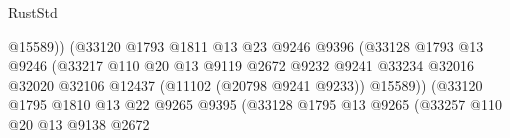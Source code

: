 \begin{lexlean}{RustStd}
\begin{coremodule}
                                                    @15589))
                                                (@33120
                                                  @1793
                                                  @1811
                                                  @13
                                                  @23
                                                  @9246
                                                  @9396
                                                  (@33128
                                                    @1793
                                                    @13
                                                    @9246
                                                    (@33217
                                                      @110
                                                      @20
                                                      @13
                                                      @9119
                                                      @2672
                                                      @9232
                                                      @9241
                                                      @33234
                                                      @32016
                                                      @32020
                                                      @32106
                                                      @12437
                                                      (@11102 (@20798 @9241 @9233))
                                                      @15589))
                                                  (@33120
                                                    @1795
                                                    @1810
                                                    @13
                                                    @22
                                                    @9265
                                                    @9395
                                                    (@33128
                                                      @1795
                                                      @13
                                                      @9265
                                                      (@33257
                                                        @110
                                                        @20
                                                        @13
                                                        @9138
                                                        @2672

\end{coremodule}
\end{lexlean}
